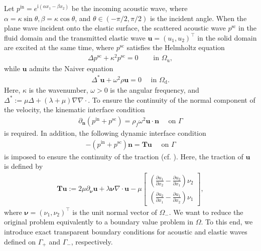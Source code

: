 \documentclass[final,3p,times]{elsarticle}
\begin{document}
Let $ p^\mathrm{in}=e^{\mathrm{i}\left(\alpha x_1-\beta x_2\right)}$ be the incoming acoustic wave, where $\alpha=\kappa \sin \theta, \beta=\kappa \cos \theta$, and $\theta \in(-\pi / 2, \pi / 2)$ is the incident angle. When the plane wave incident onto the elastic surface, the scattered acoustic wave $p^\mathrm{sc}$ in the fluid domain and the transmitted elastic wave $\boldsymbol{u}=\left(u_1, u_2\right)^{\top}$ in the solid domain are excited at the same time, where $p^\mathrm{sc}$ satisfies the Helmholtz equation
\begin{align*}
	\Delta p^\mathrm{sc}+\kappa^2 p^\mathrm{sc}=0 \quad &\text { in } \Omega_\mathrm{u},
\end{align*}
while $\boldsymbol{u}$ admits the Naiver equation
\begin{align}\label{navier}
	\Delta^* \boldsymbol{u} + \omega^2 \rho \boldsymbol{u}=0 \quad \text { in } \Omega_\mathrm{d}.
\end{align}
Here, $\kappa$ is the wavenumber, $\omega>0$ is the angular frequency, and $\Delta^* :=\mu \Delta + (\lambda+\mu) \nabla \nabla \cdot$. To ensure the continuity of the normal component of the velocity, the kinematic interface condition
\begin{align*}
	\partial_{\boldsymbol{n}} (p^\mathrm{in}+p^\mathrm{sc}) =\rho_f \omega^2 \boldsymbol{u} \cdot \boldsymbol{n} \quad \text { on } \Gamma
\end{align*}
is required. In addition, the following dynamic interface condition
\begin{align*}
	-(p^\mathrm{in}+p^\mathrm{sc}) \boldsymbol{n} =\boldsymbol{T} \boldsymbol{u} \quad \text { on } \Gamma
\end{align*}
is imposed to ensure the continuity of the traction (cf. \cite{Lin23, Xu21, Yin17}). Here, the traction of $\boldsymbol{u}$ is defined by 
\begin{align}\label{utrac}
	\boldsymbol{T}\boldsymbol{u}:=2 \mu \partial_{\boldsymbol{\nu}} \boldsymbol{u}+\lambda \boldsymbol{\nu} \nabla \cdot \boldsymbol{u}
	-\mu \left[\begin{array}{l}\left(\frac{\partial u_1}{\partial x_2}-\frac{\partial u_2}{\partial x_1}\right)\nu_2 \\ \left(\frac{\partial u_2}{\partial x_1}-\frac{\partial u_1}{\partial x_2}\right)\nu_1\end{array}\right],
\end{align}
where $\boldsymbol{\nu}=\left(\nu_1, \nu_2\right)^{\top}$ is the unit normal vector of $\Omega_-$. We want to reduce the original problem equivalently to a boundary value problem in $\Omega$. To this end, we introduce exact transparent boundary conditions for acoustic and elastic waves defined on $\Gamma_+$ and $\Gamma_-$, respectively.
\end{document}
